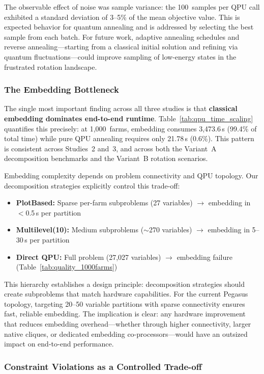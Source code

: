 The observable effect of noise was sample variance: the 100~samples per QPU call exhibited a standard deviation of 3--5\% of the mean objective value. This is expected behavior for quantum annealing and is addressed by selecting the best sample from each batch. For future work, adaptive annealing schedules and reverse annealing---starting from a classical initial solution and refining via quantum fluctuations---could improve sampling of low-energy states in the frustrated rotation landscape.

\subsubsection{The Embedding Bottleneck}

The single most important finding across all three studies is that \textbf{classical embedding dominates end-to-end runtime}. Table~\ref{tab:qpu_time_scaling} quantifies this precisely: at 1,000~farms, embedding consumes 3,473.6\,s (99.4\% of total time) while pure QPU annealing requires only 21.78\,s (0.6\%). This pattern is consistent across Studies~2 and~3, and across both the Variant~A decomposition benchmarks and the Variant~B rotation scenarios.

Embedding complexity depends on problem connectivity and QPU topology. Our decomposition strategies explicitly control this trade-off:
\begin{itemize}
    \item \textbf{PlotBased:} Sparse per-farm subproblems (27 variables) $\to$ embedding in $<$0.5\,s per partition
    \item \textbf{Multilevel(10):} Medium subproblems ($\sim$270 variables) $\to$ embedding in 5--30\,s per partition
    \item \textbf{Direct QPU:} Full problem (27,027 variables) $\to$ embedding failure (Table~\ref{tab:quality_1000farms})
\end{itemize}

This hierarchy establishes a design principle: decomposition strategies should create subproblems that match hardware capabilities. For the current Pegasus topology, targeting 20--50 variable partitions with sparse connectivity ensures fast, reliable embedding. The implication is clear: any hardware improvement that reduces embedding overhead---whether through higher connectivity, larger native cliques, or dedicated embedding co-processors---would have an outsized impact on end-to-end performance.

\subsubsection{Constraint Violations as a Controlled Trade-off}

